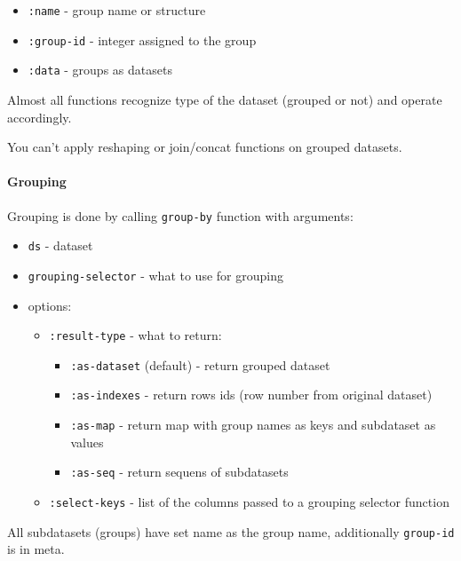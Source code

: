 \documentclass[]{article}
\providecommand{\tightlist}{%
  \setlength{\itemsep}{0pt}\setlength{\parskip}{0pt}}
\let\oldparagraph\paragraph
\renewcommand{\paragraph}[1]{\oldparagraph{#1}\mbox{}}
\begin{document}
\begin{itemize}
\tightlist
\item
  \texttt{:name} - group name or structure
\item
  \texttt{:group-id} - integer assigned to the group
\item
  \texttt{:data} - groups as datasets
\end{itemize}

Almost all functions recognize type of the dataset (grouped or not) and
operate accordingly.

You can't apply reshaping or join/concat functions on grouped datasets.

\hypertarget{grouping}{%
\paragraph{Grouping}\label{grouping}}

Grouping is done by calling \texttt{group-by} function with arguments:

\begin{itemize}
\tightlist
\item
  \texttt{ds} - dataset
\item
  \texttt{grouping-selector} - what to use for grouping
\item
  options:

  \begin{itemize}
  \tightlist
  \item
    \texttt{:result-type} - what to return:

    \begin{itemize}
    \tightlist
    \item
      \texttt{:as-dataset} (default) - return grouped dataset
    \item
      \texttt{:as-indexes} - return rows ids (row number from original
      dataset)
    \item
      \texttt{:as-map} - return map with group names as keys and
      subdataset as values
    \item
      \texttt{:as-seq} - return sequens of subdatasets
    \end{itemize}
  \item
    \texttt{:select-keys} - list of the columns passed to a grouping
    selector function
  \end{itemize}
\end{itemize}

All subdatasets (groups) have set name as the group name, additionally
\texttt{group-id} is in meta.
\end{document}
